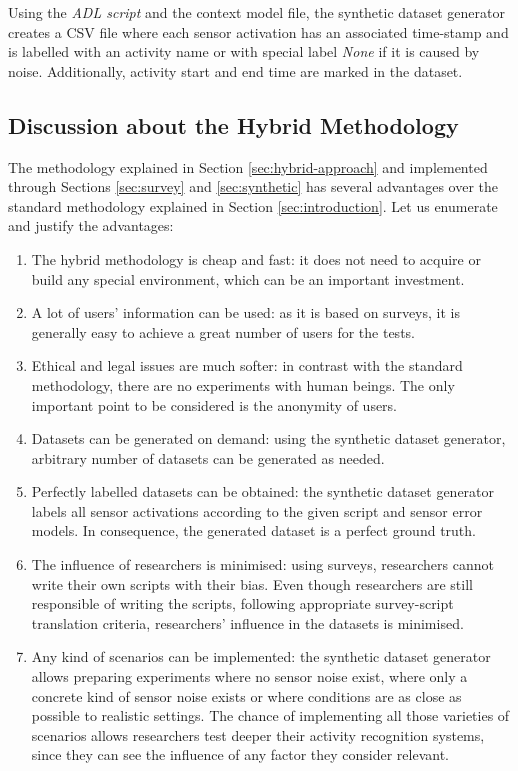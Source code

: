 Using the \textit{ADL script} and the context model file, the synthetic dataset generator creates a CSV file where each sensor activation has an associated time-stamp and is labelled with an activity name or with special label \textit{None} if it is caused by noise. Additionally, activity start and end time are marked in the dataset.

\subsection{Discussion about the Hybrid Methodology}
\begin{comment}
- Explain the advantages: generate virtually infinite datasets, arbitrary number of days, perfectly labelled, sensor noise, erratic behaviour, realistic time lapses
 - Explain the main disadvantages: erratic behaviour difficult to capture
 \end{comment}
The methodology explained in Section \ref{sec:hybrid-approach} and implemented through Sections \ref{sec:survey} and \ref{sec:synthetic} has several advantages over the standard methodology explained in Section \ref{sec:introduction}. Let us enumerate and justify the advantages:

\begin{enumerate}
 \item The hybrid methodology is cheap and fast: it does not need to acquire or build any special environment, which can be an important investment. 
 \item A lot of users' information can be used: as it is based on surveys, it is generally easy to achieve a great number of users for the tests.
 \item Ethical and legal issues are much softer: in contrast with the standard methodology, there are no experiments with human beings. The only important point to be considered is the anonymity of users.
 \item Datasets can be generated on demand: using the synthetic dataset generator, arbitrary number of datasets can be generated as needed.
 \item Perfectly labelled datasets can be obtained: the synthetic dataset generator labels all sensor activations according to the given script and sensor error models. In consequence, the generated dataset is a perfect ground truth. 
 \item The influence of researchers is minimised: using surveys, researchers cannot write their own scripts with their bias. Even though researchers are still responsible of writing the scripts, following appropriate survey-script translation criteria, researchers' influence in the datasets is minimised.
 \item Any kind of scenarios can be implemented: the synthetic dataset generator allows preparing experiments where no sensor noise exist, where only a concrete kind of sensor noise exists or where conditions are as close as possible to realistic settings. The chance of implementing all those varieties of scenarios allows researchers test deeper their activity recognition systems, since they can see the influence of any factor they consider relevant. 
\end{enumerate}

